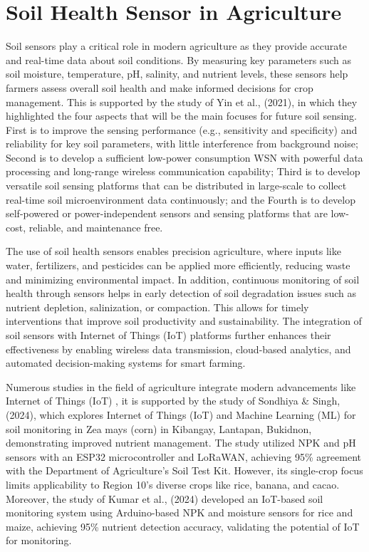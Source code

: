 {\section{Soil Health Sensor in Agriculture}
Soil sensors play a critical role in modern agriculture as they provide accurate and real-time data about soil conditions. By measuring key parameters such as soil moisture, temperature, pH, salinity, and nutrient levels, these sensors help farmers assess overall soil health and make informed decisions for crop management. This is supported by the study of  Yin et al., (2021), in which they highlighted the four aspects that will be the main focuses for future soil sensing. First is to improve the sensing performance (e.g., sensitivity and specificity) and reliability for key soil parameters, with little interference from background noise;  Second is to develop a sufficient low-power consumption WSN with powerful data processing and long-range wireless communication capability; Third is to develop versatile soil sensing platforms that can be distributed in large-scale to collect real-time soil microenvironment data continuously; and the Fourth is to develop self-powered or power-independent sensors and sensing platforms that are low-cost, reliable, and maintenance free.

The use of soil health sensors enables precision agriculture, where inputs like water, fertilizers, and pesticides can be applied more efficiently, reducing waste and minimizing environmental impact. In addition, continuous monitoring of soil health through sensors helps in early detection of soil degradation issues such as nutrient depletion, salinization, or compaction. This allows for timely interventions that improve soil productivity and sustainability. The integration of soil sensors with Internet of Things (IoT) platforms further enhances their effectiveness by enabling wireless data transmission, cloud-based analytics, and automated decision-making systems for smart farming.

Numerous studies in the field of agriculture integrate modern advancements like Internet of Things (IoT) , it is supported by the study of Sondhiya \& Singh, (2024), which explores  Internet of Things (IoT) and Machine Learning (ML) for soil monitoring in Zea mays (corn) in Kibangay, Lantapan, Bukidnon, demonstrating improved nutrient management. The study utilized NPK and pH sensors with an ESP32 microcontroller and LoRaWAN, achieving 95\% agreement with the Department of Agriculture’s Soil Test Kit. However, its single-crop focus limits applicability to Region 10’s diverse crops like rice, banana, and cacao. Moreover, the study of Kumar et al., (2024) developed an IoT-based soil monitoring system using Arduino-based NPK and moisture sensors for rice and maize, achieving 95\% nutrient detection accuracy, validating the potential of IoT for  monitoring.

}
